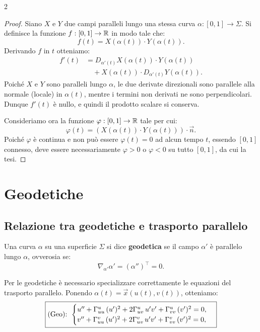 \begin{multicols*}{2}
    \begin{proof}
        Siano $X$ e $Y$ due campi paralleli lungo una stessa curva $\alpha : [0, 1] \to \Sigma$.
        Si definisce la funzione $f : [0, 1] \to \mathbb{R}$ in modo tale che:
        \[
            f(t) = X(\alpha(t)) \cdot Y(\alpha(t)).
        \]
        Derivando $f$ in $t$ otteniamo:
        \begin{align*}
            f'(t) & = D_{\alpha'(t)} X(\alpha(t)) \cdot Y(\alpha(t))        \\
                  & \quad + X(\alpha(t)) \cdot D_{\alpha'(t)} Y(\alpha(t)).
        \end{align*}
        Poiché $X$ e $Y$ sono paralleli lungo $\alpha$, le due derivate direzionali sono
        parallele alla normale (locale) in $\alpha(t)$, mentre i termini non derivati
        ne sono perpendicolari. Dunque $f'(t)$ è nullo, e quindi il prodotto scalare si conserva. \smallskip

        Consideriamo ora la funzione $\varphi : [0, 1] \to \mathbb{R}$ tale per cui:
        \[
            \varphi(t) = (X(\alpha(t)) \cdot Y(\alpha(t))) \cdot \vec{n}.
        \]
        Poiché $\varphi$ è continua e non può essere $\varphi(t) = 0$ ad alcun tempo $t$,
        essendo $[0, 1]$ connesso, deve essere necessariamente $\varphi > 0$ o
        $\varphi < 0$ su tutto $[0, 1]$, da cui la tesi.
    \end{proof}

    \section{Geodetiche}

    \subsection{Relazione tra geodetiche e trasporto parallelo}

    \begin{definition}
        Una curva $\alpha$ su una superficie $\Sigma$ si dice
        \textbf{geodetica} se il campo $\alpha'$ è parallelo lungo
        $\alpha$, ovverosia se:
        \[
            \boxed{\nabla_{\alpha'} \alpha' = (\alpha'')^\top = 0.}
        \]
    \end{definition}

    \begin{remark}
        Per le geodetiche è necessario specializzare correttamente
        le equazioni del trasporto parallelo. Ponendo
        $\alpha(t) = \vec{x}(u(t), v(t))$, otteniamo:
        \begin{equation*} \label{eq:Geo}
            \boxed{\textnormal{(Geo):  } \begin{cases}
                    u'' + \Gamma_{uu}^u \, (u')^2 + 2 \Gamma_{uv}^u \, u'v' + \Gamma_{vv}^u \, (v')^2 = 0, \\
                    v'' + \Gamma_{uu}^v \, (u')^2 + 2 \Gamma_{uv}^v \, u'v' + \Gamma_{vv}^v \, (v')^2 = 0,
                \end{cases}}
        \end{equation*}
    \end{remark}


\end{multicols*}
